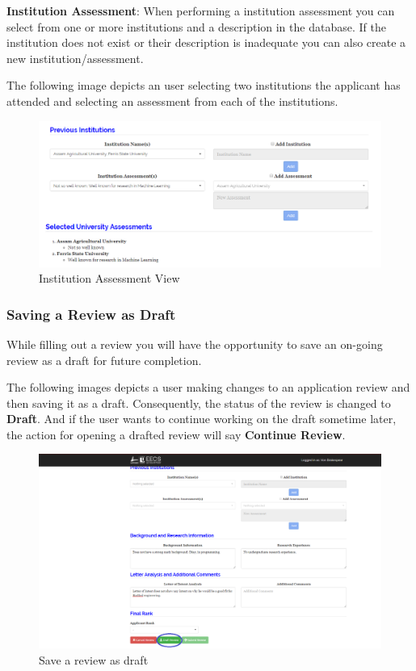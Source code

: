 \documentclass[fontsize=12pt,paper=letter,twoside]{scrartcl}
\begin{document}
\bigskip
\noindent \textbf{Institution Assessment}: When performing a institution assessment you can select from one or more institutions and a description in the database. If the institution does not exist or their description is inadequate you can also create a new institution/assessment.

\bigskip
\noindent The following image depicts an user selecting two institutions the applicant has attended and selecting an assessment from each of the institutions.

\begin{figure}[!htb]
\begin{center}
\includegraphics[width=.7\textwidth]{images/cm/uni_assessment.png}
\end{center}
\caption{Institution Assessment View}
\label{fig:cm:uni_assessment}
\end{figure}

\clearpage
\newpage
\subsubsection{Saving a Review as Draft}
While filling out a review you will have the opportunity to save an on-going review as a draft for future completion.

\bigskip
\noindent The following images depicts a user making changes to an application review and then saving it as a draft. Consequently, the status of the review is changed to \textbf{Draft}. And if the user wants to continue working on the draft sometime later, the action for opening a drafted review will say \textbf{Continue Review}.

\begin{figure}[!htb]
\begin{center}
\includegraphics[width=.9\textwidth]{images/cm/save_as_draft_review.png}
\end{center}
\caption{Save a review as draft}
\label{fig:cm:save_as_draft_review}
\end{figure}
\end{document}
